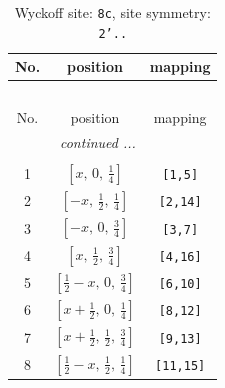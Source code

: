 \documentclass[fleqn,8pt]{jsarticle}
\begin{document}
\begin{longtable}{ccc}
\caption{Wyckoff site: {\tt 8c}, site symmetry: {\tt 2'..}}
 \\
 \hline \hline
No. & position & mapping \\ \hline \endfirsthead

\multicolumn{2}{l}{\tablename\ \thetable{}} \\
 \hline \hline
No. & position & mapping \\ \hline \endhead

 \hline \hline
\multicolumn{2}{r}{\footnotesize\it continued ...} \\ \endfoot

 \hline \hline
\multicolumn{2}{r}{} \\ \endlastfoot

1 & $\left[ x,\, 0,\, \frac{1}{4} \right]$ & {\tt [1,5]} \\ \hline
2 & $\left[ - x,\, \frac{1}{2},\, \frac{1}{4} \right]$ & {\tt [2,14]} \\ \hline
3 & $\left[ - x,\, 0,\, \frac{3}{4} \right]$ & {\tt [3,7]} \\ \hline
4 & $\left[ x,\, \frac{1}{2},\, \frac{3}{4} \right]$ & {\tt [4,16]} \\ \hline
5 & $\left[ \frac{1}{2} - x,\, 0,\, \frac{3}{4} \right]$ & {\tt [6,10]} \\ \hline
6 & $\left[ x + \frac{1}{2},\, 0,\, \frac{1}{4} \right]$ & {\tt [8,12]} \\ \hline
7 & $\left[ x + \frac{1}{2},\, \frac{1}{2},\, \frac{3}{4} \right]$ & {\tt [9,13]} \\ \hline
8 & $\left[ \frac{1}{2} - x,\, \frac{1}{2},\, \frac{1}{4} \right]$ & {\tt [11,15]} \\
\end{longtable}
\renewcommand{\arraystretch}{1.2}
\end{document}
